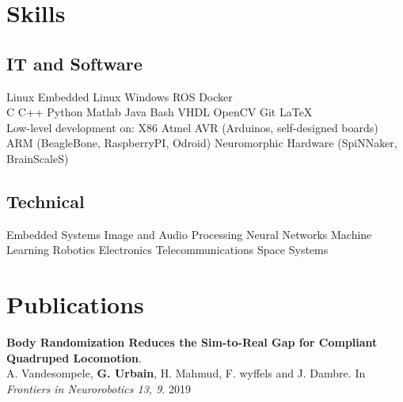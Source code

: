\documentclass[a4paper]{deedy-resume} %
\begin{document}
{\begin{minipage}[b]{0.42\linewidth}
	\section{Skills}
	\vspace{5pt}
	\subsection{IT and Software}
	\vspace{2pt}
	Linux \textbullet{} Embedded Linux \textbullet{} Windows \textbullet{} ROS \textbullet{} Docker\\
	\vspace{3pt}
	C \textbullet{} C++ \textbullet{} Python \textbullet{} Matlab \textbullet{} Java \textbullet{} Bash \textbullet{} VHDL \textbullet{} OpenCV \textbullet{} Git \textbullet{} \LaTeX\\
	\vspace{3pt}
	Low-level development on: X86 \textbullet{} Atmel AVR (Arduinos, self-designed boards) \textbullet{} ARM (BeagleBone, RaspberryPI, Odroid) \textbullet{} Neuromorphic Hardware (SpiNNaker, BrainScaleS)
	\vspace{5pt}
	
	\subsection{Technical}
	Embedded Systems \textbullet{}
	Image and Audio Processing \textbullet{} Neural Networks \textbullet{} Machine Learning \textbullet{} Robotics \textbullet{} Electronics \textbullet{} Telecommunications \textbullet{} Space Systems
	\vspace{5pt}
\end{minipage}

\vspace{10pt}



\section{Publications}
\vspace{5pt}

\textbf{Body Randomization Reduces the Sim-to-Real Gap for Compliant Quadruped Locomotion}. \\
A. Vandesompele, \textbf{G. Urbain}, H. Mahmud,  F. wyffels and J. Dambre.
In \textit{Frontiers in Neurorobotics 13, 9}. 2019

}
\end{document}
